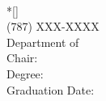 ﻿%



\backmatter %

\biography{										%
			
}


\begin{simpleenv}{}{}{}{}%
\pagestyle{empty}
\begin{flushleft}
\Title\\*[\BaseDiff\baselineskip]
\FullName\\%
(787) XXX-XXXX\\%
Department of \Department \\%
Chair: \Chair\\%
Degree: \DegreeType\\%
Graduation Date: \GradMonth~\GradYear%
\end{flushleft}
\GoDouble%

\end{simpleenv}

